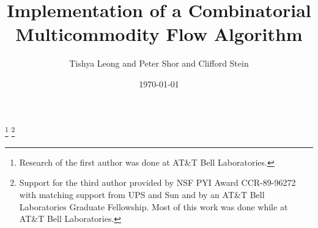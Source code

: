 

\def\Proof{\par\noindent{\sl Proof\/}:\enspace}
\def\eps{\epsilon}
\setlength{\parskip}{1pt}

\newtheorem{theorem}{Theorem}[section]
\newtheorem{lemma}{Lemma}[section]
\newtheorem{corollary}{Corollary}[section]
\newtheorem{definition}{Definition}[section]
\newtheorem{fact}{Fact}[section]
\newtheorem{remark}{Remark}[section]
\newtheorem{observation}{Observation}[section]
\newtheorem{assumption}{Assumption}[section]
\newtheorem{imp}{Implementation Note}[section]
\newtheorem{problem}{Problem}[section]
\newtheorem{proposition}{Proposition}[section]
\newtheorem{cor}{Corollary}[section]
\newtheorem{alg}{Algorithm}[section]



\def\Proof{\penalty25\medskip\noindent{\sl Proof:}\enskip}
\def\QED{\quad\blackslug\lower 8.5pt\null}
\def\mod{\,{\rm mod}\penalty900\,}
\def\Proof{\par\noindent{\bf Proof\/}:\enspace}
\def\Remark{\par\noindent{\sl Remark\/}:\enspace}
\def\Keywords{\vspace*{8pt}\par\noindent{\sl Keywords\/}:\enspace}

\newcommand{\inv}[1]{{#1}^{-1}}
\newcommand{\set}[1]{\left\{ #1 \right\}}





\title[A COMBINATORIAL MULTICOMMODITY FLOW
ALGORITHM]{Implementation of a Combinatorial Multicommodity Flow Algorithm} 

\author[TISHYA LEONG AND PETER SHOR AND CLIFFORD STEIN]{Tishya Leong
and Peter Shor and Clifford Stein} 

\address{Department of Mechanical Engineering, Stanford University,
Palo Alto, CA}

\address{AT\&T Bell Laboratories,  Murray Hill, NJ}

\address{Department of Mathematics and Computer Science, Dartmouth
College, Hanover, NH}

\date{\today}


\thanks{Research of the first author was done at AT\&T Bell Laboratories.}
\thanks{Support for the third author provided by NSF PYI 
        Award CCR-89-96272 with matching support from UPS and Sun
	and by an AT\&T Bell Laboratories Graduate Fellowship.
	Most of this work was done while at AT\&T Bell Laboratories.}
	


